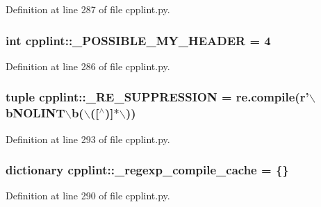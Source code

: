 Definition at line 287 of file cpplint.py.

\hypertarget{namespacecpplint_a40cf12907322271bf94416a9fe602d96}{
\subsubsection[{\_\-POSSIBLE\_\-MY\_\-HEADER}]{\setlength{\rightskip}{0pt plus 5cm}int {\bf cpplint::\_\-POSSIBLE\_\-MY\_\-HEADER} = 4}}
\label{namespacecpplint_a40cf12907322271bf94416a9fe602d96}


Definition at line 286 of file cpplint.py.

\hypertarget{namespacecpplint_af6a02614cf018ab890ede0b3a936ba6e}{
\subsubsection[{\_\-RE\_\-SUPPRESSION}]{\setlength{\rightskip}{0pt plus 5cm}tuple {\bf cpplint::\_\-RE\_\-SUPPRESSION} = re.compile(r'$\backslash$bNOLINT$\backslash$b($\backslash$(\mbox{[}$^\wedge$)\mbox{]}$\ast$$\backslash$))}}
\label{namespacecpplint_af6a02614cf018ab890ede0b3a936ba6e}


Definition at line 293 of file cpplint.py.

\hypertarget{namespacecpplint_a3eea0656ee957fff7d4511579c92d250}{
\subsubsection[{\_\-regexp\_\-compile\_\-cache}]{\setlength{\rightskip}{0pt plus 5cm}dictionary {\bf cpplint::\_\-regexp\_\-compile\_\-cache} = \{\}}}
\label{namespacecpplint_a3eea0656ee957fff7d4511579c92d250}


Definition at line 290 of file cpplint.py.

